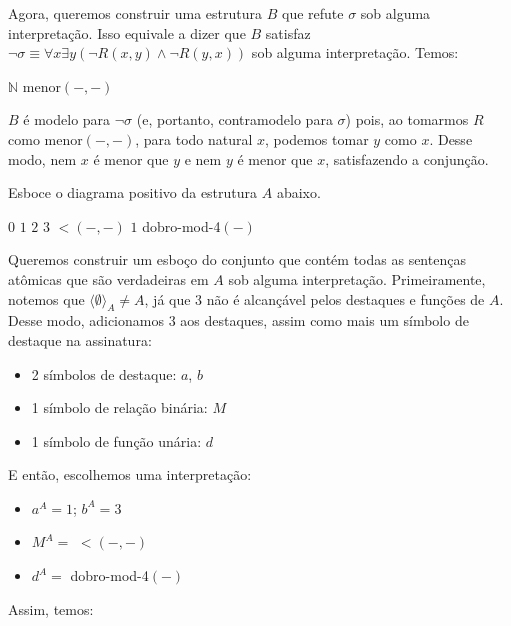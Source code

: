 \begin{rexercises}
\begin{question}
\begin{resolution}
            Agora, queremos construir uma estrutura $B$ que refute $\sigma$ sob alguma interpretação. Isso equivale a dizer que $B$ satisfaz $\neg \sigma \equiv \forall x\exists y(\neg R(x, y) \land \neg R(y, x))$ sob alguma interpretação. Temos:

            \begin{center}
                \begin{structure}
                    {$\mathbb{N}$}
                    {}
                    {menor$(-,-)$}
                    {}
                    {}
                    {}    
                \end{structure}
            \end{center}

            $B$ é modelo para $\neg \sigma$ (e, portanto, contramodelo para $\sigma$) pois, ao tomarmos $R$ como menor$(-,-)$, para todo natural $x$, podemos tomar $y$ como $x$. Desse modo, nem $x$ é menor que $y$ e nem $y$ é menor que $x$, satisfazendo a conjunção.
        \end{resolution}
    \end{question}

    \begin{question}
        Esboce o diagrama positivo da estrutura $A$ abaixo.
        
        \begin{center}
            \begin{structure}
                {}
                {$0$ $1$ $2$ $3$}
                {$<$$(-,-)$}
                {$1$}
                {dobro-mod-4$(-)$}
            \end{structure}
        \end{center}
        \begin{resolution}
            Queremos construir um esboço do conjunto que contém todas as sentenças atômicas que são verdadeiras em $A$ sob alguma interpretação. Primeiramente, notemos que $\langle \emptyset \rangle_A \neq A$, já que $3$ não é alcançável pelos destaques e funções de $A$. Desse modo, adicionamos $3$ aos destaques, assim como mais um símbolo de destaque na assinatura:
            \begin{itemize}
                \item 2 símbolos de destaque: $a$, $b$
                \item 1 símbolo de relação binária: $M$
                \item 1 símbolo de função unária: $d$
            \end{itemize}
            E então, escolhemos uma interpretação:
            \begin{itemize}
                \item $a^A = 1$; $b^A = 3$
                \item $M^A =$ $<$$(-,-)$
                \item $d^A =$ dobro-mod-4$(-)$ 
            \end{itemize}
            Assim, temos:


\end{resolution}
\end{question}
\end{rexercises}
